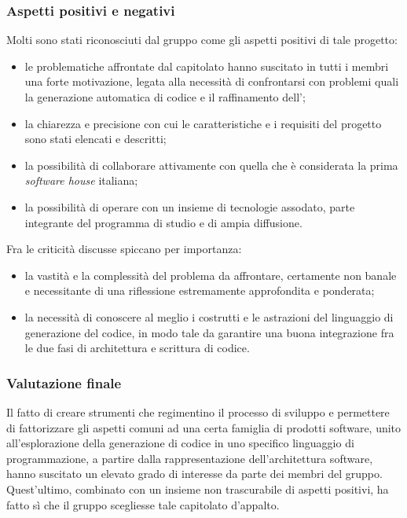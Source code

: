 		\subsubsection{Aspetti positivi e negativi}
		Molti sono stati riconosciuti dal gruppo come gli aspetti positivi di tale progetto:
		\begin{itemize}
			\item le problematiche affrontate dal capitolato hanno suscitato in tutti i membri una forte motivazione, legata alla necessità di confrontarsi 
			con problemi quali la generazione automatica di codice e il raffinamento dell';
			\item la chiarezza e precisione con cui le caratteristiche e i requisiti del progetto sono stati elencati e descritti;
			\item la possibilità di collaborare attivamente con quella che è considerata 
			la prima \emph{software house} italiana;
			\item la possibilità di operare con un insieme di tecnologie assodato, parte integrante del programma di studio e di ampia diffusione.
		\end{itemize}
		Fra le criticità discusse spiccano per importanza:
		\begin{itemize}
			\item la vastità e la complessità del problema da affrontare, certamente non banale e necessitante di una riflessione 
			estremamente approfondita e ponderata;
			\item la necessità di conoscere al meglio i costrutti e le astrazioni del linguaggio di generazione del codice, 
			in modo tale da garantire una buona integrazione fra le due fasi di architettura e scrittura di codice.
		\end{itemize}
		\subsubsection{Valutazione finale} 
		Il fatto di creare strumenti che regimentino il processo di sviluppo e permettere di fattorizzare gli aspetti comuni ad una certa famiglia di 
		prodotti software, unito all'esplorazione della generazione di codice in uno specifico linguaggio di programmazione, a partire dalla rappresentazione 
		dell'architettura software, hanno suscitato un elevato grado di interesse da parte dei membri del gruppo. Quest'ultimo, combinato con un insieme non 
		trascurabile di aspetti positivi, ha fatto sì che il gruppo \hx{} scegliesse tale capitolato d'appalto.
	
